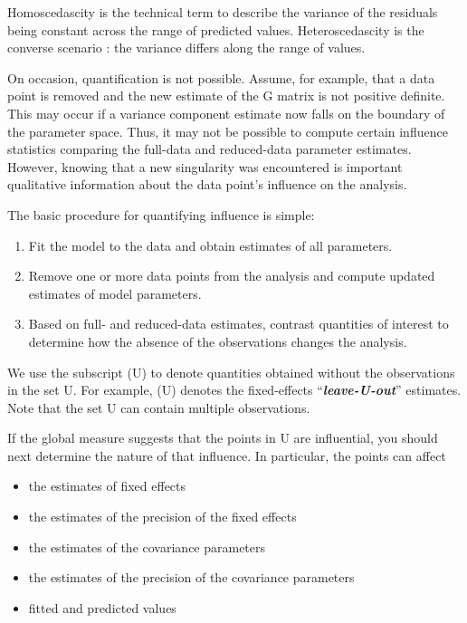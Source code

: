 \documentclass[12pt, a4paper]{report}
\theoremstyle{plain}
\theoremstyle{definition}
\theoremstyle{remark}
\begin{document}


Homoscedascity is the technical term to describe the variance of the
residuals being constant across the range of predicted values.
Heteroscedascity is the converse scenario : the variance differs along
the range of values.



On occasion, quantification is not possible. Assume, for example, that a data point is removed
and the new estimate of the G matrix is not positive definite. This may occur if a variance component
estimate now falls on the boundary of the parameter space. Thus, it may not be possible to compute certain
influence statistics comparing the full-data and reduced-data parameter estimates. However, knowing that
a new singularity was encountered is important qualitative information about the data point’s influence on
the analysis.

The basic procedure for quantifying influence is simple:

\begin{enumerate}
	\item Fit the model to the data and obtain estimates of all parameters.
	\item Remove one or more data points from the analysis and compute updated estimates of model parameters.
	\item Based on full- and reduced-data estimates, contrast quantities of interest to determine how the absence
	of the observations changes the analysis.
\end{enumerate}
We use the subscript (U) to denote quantities obtained without the observations in the set U. For example,
(U) denotes the fixed-effects “\textit{\textbf{leave-U-out}}” estimates. Note that the set U can contain multiple observations.


If the global measure suggests that the points in U are influential, you should next determine the nature of
that influence. In particular, the points can affect
\begin{itemize}
	\item the estimates of fixed effects
	\item the estimates of the precision of the fixed effects
	\item the estimates of the covariance parameters
	\item the estimates of the precision of the covariance parameters
	\item fitted and predicted values
\end{itemize}
\end{document}
